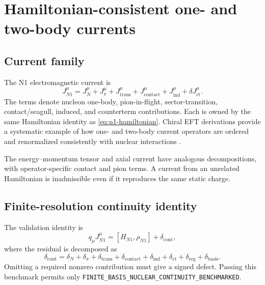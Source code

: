 \documentclass[11pt]{article}
\newcommand{\ct}{\mathrm{ct}}
\newcommand{\reg}{\mathrm{reg}}
\begin{document}
\section{Hamiltonian-consistent one- and two-body currents}
\label{sec:currents}

\subsection{Current family}

The N1 electromagnetic current is
\begin{equation}
 J_{N1}^{\mu}
 =
 J_N^{\mu}
 +J_{\pi}^{\mu}
 +J_{\mathrm{trans}}^{\mu}
 +J_{\mathrm{contact}}^{\mu}
 +J_{\mathrm{ind}}^{\mu}
 +\delta J_{\ct}^{\mu}.
 \label{eq:n1-current}
\end{equation}
The terms denote nucleon one-body, pion-in-flight, sector-transition,
contact/seagull, induced, and counterterm contributions.  Each is owned by the
same Hamiltonian identity as \cref{eq:n1-hamiltonian}.  Chiral EFT derivations
provide a systematic example of how one- and two-body current operators are
ordered and renormalized consistently with nuclear interactions
\cite{Baroni2015,Krebs2020,Schiavilla2018}.

The energy--momentum tensor and axial current have analogous decompositions,
with operator-specific contact and pion terms.  A current from an unrelated
Hamiltonian is inadmissible even if it reproduces the same static charge.

\subsection{Finite-resolution continuity identity}

The validation identity is
\begin{equation}
 q_{\mu}J_{N1}^{\mu}
 =
 [H_{N1},\rho_{N1}]
 +\delta_{\mathrm{cont}},
 \label{eq:n1-continuity}
\end{equation}
where the residual is decomposed as
\begin{equation}
 \delta_{\mathrm{cont}}
 =
 \delta_N
 +\delta_{\pi}
 +\delta_{\mathrm{trans}}
 +\delta_{\mathrm{contact}}
 +\delta_{\mathrm{ind}}
 +\delta_{\ct}
 +\delta_{\reg}
 +\delta_{\mathrm{basis}}.
 \label{eq:continuity-ledger}
\end{equation}
Omitting a required nonzero contribution must give a signed defect.  Passing
this benchmark permits only
\texttt{FINITE\_BASIS\_NUCLEAR\_CONTINUITY\_BENCHMARKED}.
\end{document}
